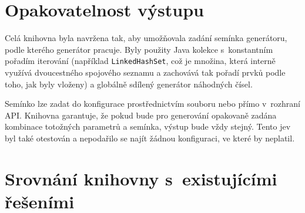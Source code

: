 
\section{Opakovatelnost výstupu}


Celá knihovna byla navržena tak, aby umožňovala zadání semínka generátoru, podle kterého generátor pracuje.
Byly použity Java kolekce s~konstantním pořadím iterování (například \texttt{LinkedHashSet}, což je množina, která interně využívá dvoucestného spojového seznamu a zachovává tak pořadí prvků podle toho, jak byly vloženy) a globálně sdílený generátor náhodných čísel.
\par
Semínko lze zadat do konfigurace prostřednictvím souboru nebo přímo v~rozhraní API.
Knihovna garantuje, že pokud bude pro generování opakovaně zadána kombinace totožných parametrů a semínka, výstup bude vždy stejný.
Tento jev byl také otestován a nepodařilo se najít žádnou konfiguraci, ve které by neplatil.


\section{Srovnání knihovny s~existujícími řešeními}


